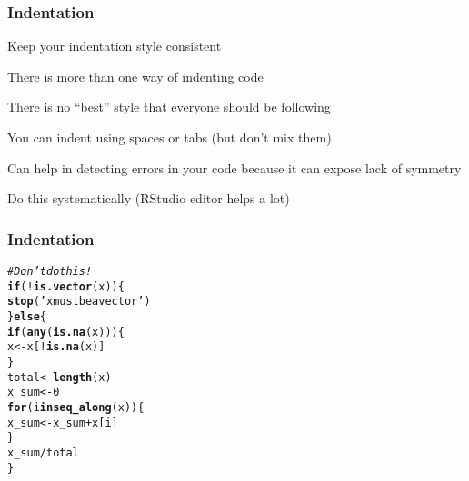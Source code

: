 \documentclass[12pt]{beamer}\usepackage[]{graphicx}\usepackage[]{color}
\makeatletter
\newcommand{\hlnum}[1]{\textcolor[rgb]{0.686,0.059,0.569}{#1}}%
\newcommand{\hlstr}[1]{\textcolor[rgb]{0.192,0.494,0.8}{#1}}%
\newcommand{\hlcom}[1]{\textcolor[rgb]{0.678,0.584,0.686}{\textit{#1}}}%
\newcommand{\hlopt}[1]{\textcolor[rgb]{0,0,0}{#1}}%
\newcommand{\hlstd}[1]{\textcolor[rgb]{0.345,0.345,0.345}{#1}}%
\newcommand{\hlkwa}[1]{\textcolor[rgb]{0.161,0.373,0.58}{\textbf{#1}}}%
\newcommand{\hlkwb}[1]{\textcolor[rgb]{0.69,0.353,0.396}{#1}}%
\newcommand{\hlkwd}[1]{\textcolor[rgb]{0.737,0.353,0.396}{\textbf{#1}}}%
\newenvironment{kframe}{%
 \def\at@end@of@kframe{}%
 \ifinner\ifhmode%
  \def\at@end@of@kframe{\end{minipage}}%
  \begin{minipage}{\columnwidth}%
 \fi\fi%
 \def\FrameCommand##1{\hskip\@totalleftmargin \hskip-\fboxsep
 \colorbox{shadecolor}{##1}\hskip-\fboxsep
     \hskip-\linewidth \hskip-\@totalleftmargin \hskip\columnwidth}%
 \MakeFramed {\advance\hsize-\width
   \@totalleftmargin\z@ \linewidth\hsize
   \@setminipage}}%
 {\par\unskip\endMakeFramed%
 \at@end@of@kframe}
\newenvironment{knitrout}{}{} %
\makeatother
\begin{document}

\begin{frame}[fragile]
\frametitle{Indentation}

\bi
  \item Keep your indentation style consistent
  \item There is more than one way of indenting code
  \item There is no ``best'' style that everyone should be following
  \item You can indent using spaces or tabs (but don't mix them)
  \item Can help in detecting errors in your code because it can expose lack of symmetry
  \item Do this systematically (RStudio editor helps a lot)
\ei

\end{frame}


\begin{frame}[fragile]
\frametitle{Indentation}

\begin{knitrout}\footnotesize
{}\color{fgcolor}\begin{kframe}
\begin{alltt}
\hlcom{# Don't do this!}
\hlkwa{if}\hlstd{(}\hlopt{!}\hlkwd{is.vector}\hlstd{(x)) \{}
\hlkwd{stop}\hlstd{(}\hlstr{'x must be a vector'}\hlstd{)}
\hlstd{\}} \hlkwa{else} \hlstd{\{}
\hlkwa{if}\hlstd{(}\hlkwd{any}\hlstd{(}\hlkwd{is.na}\hlstd{(x)))\{}
\hlstd{x} \hlkwb{<-} \hlstd{x[}\hlopt{!}\hlkwd{is.na}\hlstd{(x)]}
\hlstd{\}}
\hlstd{total} \hlkwb{<-} \hlkwd{length}\hlstd{(x)}
\hlstd{x_sum} \hlkwb{<-} \hlnum{0}
\hlkwa{for} \hlstd{(i} \hlkwa{in} \hlkwd{seq_along}\hlstd{(x)) \{}
  \hlstd{x_sum} \hlkwb{<-} \hlstd{x_sum} \hlopt{+} \hlstd{x[i]}
\hlstd{\}}
\hlstd{x_sum} \hlopt{/} \hlstd{total}
\hlstd{\}}
\end{alltt}
\end{kframe}
\end{knitrout}

\end{frame}

\end{document}
